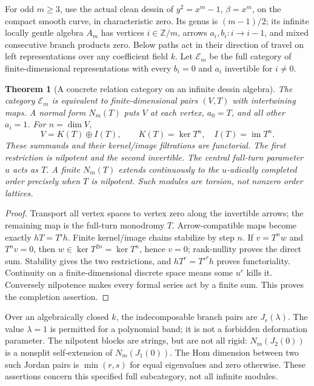 \documentclass[11pt,oneside,openany]{book}
\newtheorem{theorem}{Theorem}[chapter]
\theoremstyle{definition}\newtheorem{definition}[theorem]{Definition}
\theoremstyle{remark}\newtheorem{remark}[theorem]{Remark}
\begin{document}
For odd $m\geq3$, use the actual clean dessin of
$y^2=x^m-1$, $\beta=x^m$, on the compact smooth curve, in
characteristic zero. Its genus is $(m-1)/2$; its infinite locally gentle
algebra $A_m$ has vertices $i\in\mathbb Z/m$, arrows
$a_i,b_i:i\to i-1$, and mixed consecutive branch products zero.
Below paths act in their direction of travel on left representations over
any coefficient field $k$. Let $\mathcal E_m$ be the full category of
finite-dimensional representations with every $b_i=0$ and $a_i$ invertible
for $i\ne0$.

\begin{theorem}[A concrete relation category on an infinite dessin algebra]
\label{rel:branch}
The category $\mathcal E_m$ is equivalent to finite-dimensional pairs
$(V,T)$ with intertwining maps. A normal form $N_m(T)$ puts $V$ at each
vertex, $a_0=T$, and all other $a_i=1$. For $n=\dim V$,
\[
 V=K(T)\oplus I(T),\qquad K(T)=\ker T^n,\quad I(T)=\operatorname{im}T^n.
\]
These summands and their kernel/image filtrations are functorial. The first
restriction is nilpotent and the second invertible. The central full-turn
parameter $u$ acts as $T$. A finite $N_m(T)$ extends continuously to the
$u$-adically completed order precisely when $T$ is nilpotent. Such modules
are torsion, not nonzero order lattices.
\end{theorem}
\begin{proof}
Transport all vertex spaces to vertex zero along the invertible arrows;
the remaining map is the full-turn monodromy $T$. Arrow-compatible maps
become exactly $hT=T'h$. Finite kernel/image chains stabilize by step $n$.
If $v=T^nw$ and $T^nv=0$, then $w\in\ker T^{2n}=\ker T^n$, hence $v=0$;
rank-nullity proves the direct sum. Stability gives the two restrictions,
and $hT^r=T'^rh$ proves functoriality. Continuity on a finite-dimensional
discrete space means some $u^r$ kills it. Conversely nilpotence makes every
formal series act by a finite sum. This proves the completion assertion.
\end{proof}

Over an algebraically closed $k$, the indecomposable branch pairs are
$J_r(\lambda)$. The value $\lambda=1$ is permitted for a polynomial band;
it is not a forbidden deformation parameter. The nilpotent blocks are
strings, but are not all rigid: $N_m(J_2(0))$ is a nonsplit self-extension
of $N_m(J_1(0))$. The Hom dimension between two such Jordan pairs is
$\min(r,s)$ for equal eigenvalues and zero otherwise. These assertions
concern this specified full subcategory, not all infinite modules.
\end{document}
